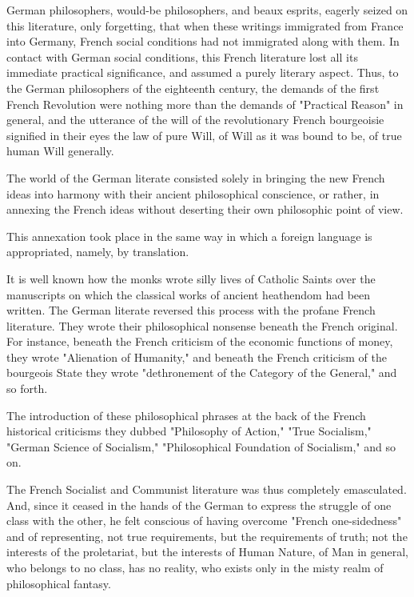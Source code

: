 \documentclass[, oneside]{article}   	%
\begin{document}
German philosophers, would-be philosophers, and beaux esprits, eagerly seized on this literature, only forgetting, that when these writings immigrated from France into Germany, French social conditions had not immigrated along with them. In contact with German social conditions, this French literature lost all its immediate practical significance, and assumed a purely literary aspect. Thus, to the German philosophers of the eighteenth century, the demands of the first French Revolution were nothing more than the demands of "Practical Reason" in general, and the utterance of the will of the revolutionary French bourgeoisie signified in their eyes the law of pure Will, of Will as it was bound to be, of true human Will generally.

The world of the German literate consisted solely in bringing the new French ideas into harmony with their ancient philosophical conscience, or rather, in annexing the French ideas without deserting their own philosophic point of view.

This annexation took place in the same way in which a foreign language is appropriated, namely, by translation.

It is well known how the monks wrote silly lives of Catholic Saints over the manuscripts on which the classical works of ancient heathendom had been written. The German literate reversed this process with the profane French literature. They wrote their philosophical nonsense beneath the French original. For instance, beneath the French criticism of the economic functions of money, they wrote "Alienation of Humanity," and beneath the French criticism of the bourgeois State they wrote "dethronement of the Category of the General," and so forth.

The introduction of these philosophical phrases at the back of
the French historical criticisms they dubbed "Philosophy of
Action," "True Socialism," "German Science of Socialism,"
"Philosophical Foundation of Socialism," and so on.

The French Socialist and Communist literature was thus completely emasculated. And, since it ceased in the hands of the German to express the struggle of one class with the other, he felt conscious of having overcome "French one-sidedness" and of representing, not true requirements, but the requirements of truth; not the interests of the proletariat, but the interests of Human Nature, of Man in general, who belongs to no class, has no reality, who exists only in the misty realm of philosophical fantasy.
\end{document}
